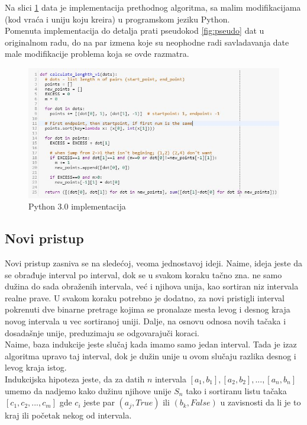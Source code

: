 \documentclass[a4paper]{article}
\begin{document}
Na slici \ref{fig:kleeimp} data je implementacija prethodnog algoritma, sa malim modifikacijama (kod vraća i uniju koju kreira) u programskom jeziku Python. \\

Pomenuta implementacija do detalja prati pseudokod \ref{fig:pseudo} dat u originalnom radu, do na par izmena koje su neophodne radi savladavanja date male modifikacije problema koja se ovde razmatra.

\begin{figure}[h!]
\includegraphics[scale=0.8]{klee_implementacija.JPG}
\caption{Python 3.0 implementacija}
\label{fig:kleeimp}
\end{figure}


\newpage
\subsection{Novi pristup}

Novi pristup zasniva se na sledećoj, veoma jednostavoj ideji. Naime, ideja jeste da se obrađuje interval po interval, dok se u svakom koraku tačno zna. ne samo dužina do sada obraženih intervala, već i njihova unija, kao sortiran niz intervala realne prave. U svakom koraku potrebno je dodatno, za novi pristigli interval pokrenuti dve binarne pretrage kojima se pronalaze mesta levog i desnog kraja novog intervala u vec sortiranoj uniji. Dalje, na osnovu odnosa novih tačaka i dosadašnje unije, preduzimaju se odgovarajuči koraci. \\

Naime, baza indukcije jeste slučaj kada imamo samo jedan interval. Tada je izaz algoritma upravo taj interval, dok je dužin unije u ovom slučaju razlika desnog i levog kraja istog. \\

Indukcijska hipoteza jeste, da za datih $n$ intervala $[a_1, b_1], [a_2, b_2], ..., [a_n, b_n]$ umemo da nadjemo kako dužinu njihove unije $S_n$ tako i sortiranu listu tačaka $[c_1, c_2, ..., c_m]$ gde $c_i$ jeste par $(a_j, True)$ ili $(b_k, False)$ u zavisnosti da li je to kraj ili početak nekog od intervala. \\
\end{document}
